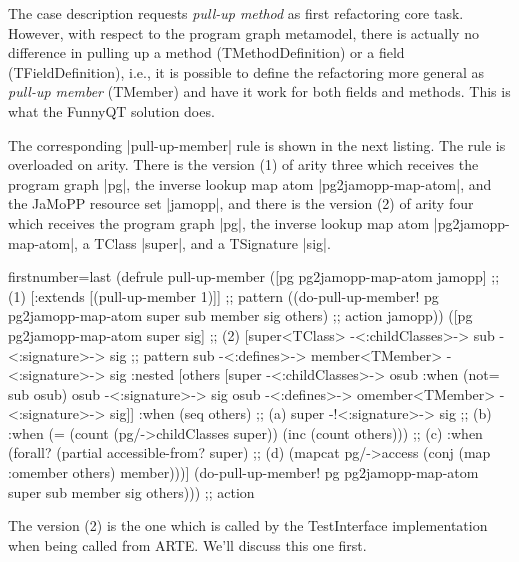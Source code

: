 \documentclass[submission]{eptcs}
\newcommand{\code}{\clojureinline}
\begin{document}
The case description requests \emph{pull-up method} as first refactoring core
task.  However, with respect to the program graph metamodel, there is actually
no difference in pulling up a method (\textsf{TMethodDefinition}) or a field
(\textsf{TFieldDefinition}), i.e., it is possible to define the refactoring
more general as \emph{pull-up member} (\textsf{TMember}) and have it work for
both fields and methods.  This is what the FunnyQT solution does.

The corresponding \code|pull-up-member| rule is shown in the next listing.  The
rule is overloaded on arity.  There is the version (1) of arity three which
receives the program graph \code|pg|, the inverse lookup map atom
\code|pg2jamopp-map-atom|, and the JaMoPP resource set \code|jamopp|, and there
is the version (2) of arity four which receives the program graph \code|pg|,
the inverse lookup map atom \code|pg2jamopp-map-atom|, a \textsf{TClass}
\code|super|, and a \textsf{TSignature} \code|sig|.

\begin{clojurecode*}{firstnumber=last}
(defrule pull-up-member
  ([pg pg2jamopp-map-atom jamopp]                                             ;; (1)
   [:extends [(pull-up-member 1)]]                                            ;; pattern
   ((do-pull-up-member! pg pg2jamopp-map-atom super sub member sig others)    ;; action
    jamopp))
  ([pg pg2jamopp-map-atom super sig]                                          ;; (2)
   [super<TClass> -<:childClasses>-> sub -<:signature>-> sig                  ;; pattern
    sub -<:defines>-> member<TMember> -<:signature>-> sig
    :nested [others [super -<:childClasses>-> osub
                     :when (not= sub osub)
                     osub -<:signature>-> sig
                     osub -<:defines>-> omember<TMember> -<:signature>-> sig]]
    :when (seq others)                                                        ;; (a)
    super -!<:signature>-> sig                                                ;; (b)
    :when (= (count (pg/->childClasses super)) (inc (count others)))          ;; (c)
    :when (forall? (partial accessible-from? super)                           ;; (d)
                   (mapcat pg/->access (conj (map :omember others) member)))]
   (do-pull-up-member! pg pg2jamopp-map-atom super sub member sig others)))   ;; action
\end{clojurecode*}

The version (2) is the one which is called by the \textsf{TestInterface}
implementation when being called from ARTE.  We'll discuss this one first.
\end{document}

